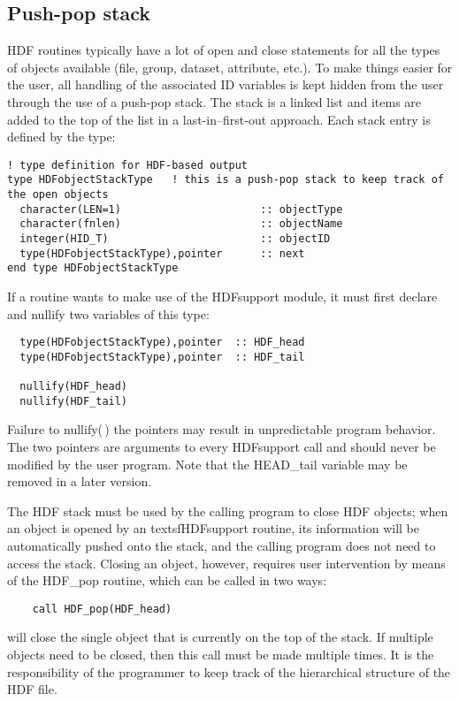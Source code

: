 \documentclass[DIV=calc, paper=letter, fontsize=11pt]{scrartcl}	 %
\begin{document}
\subsection{Push-pop stack}
HDF routines typically have a lot of \textsf{open} and \textsf{close} statements for all the types 
of objects available (file, group, dataset, attribute, etc.).  To make things easier for the user, 
all handling of the associated ID variables is kept hidden from the user through the use of a push-pop
stack.  The stack is a linked list and items are added to the top of the list in a \textsf{last-in--first-out}
approach.  Each stack entry is defined by the type:
\begin{verbatim}
! type definition for HDF-based output
type HDFobjectStackType   ! this is a push-pop stack to keep track of the open objects
  character(LEN=1)						:: objectType
  character(fnlen)						:: objectName
  integer(HID_T) 						:: objectID
  type(HDFobjectStackType),pointer		:: next
end type HDFobjectStackType
\end{verbatim}
If a routine wants to make use of the \textsf{HDFsupport} module, it must first declare
and nullify two variables of this type:
\begin{verbatim}
  type(HDFobjectStackType),pointer  :: HDF_head
  type(HDFobjectStackType),pointer  :: HDF_tail

  nullify(HDF_head)
  nullify(HDF_tail)
\end{verbatim}
Failure to \textsf{nullify(\,)} the pointers may result in unpredictable program behavior.  The two 
pointers are arguments to every \textsf{HDFsupport} call and should never be modified by the user 
program.  Note that the \textsf{HEAD\_tail} variable may be removed in a later version.

The HDF stack must be used by the calling program to close HDF objects; when an object is opened 
by an textsf{HDFsupport} routine, its information will be automatically pushed onto the stack, and the 
calling program does not need to access the stack.  Closing an object, however, requires user intervention
by means of the \textsf{HDF\_pop} routine, which can be called in two ways:
\begin{verbatim}
	call HDF_pop(HDF_head)
\end{verbatim}
will close the single object that is currently on the top of the stack. If multiple objects need to
be closed, then this call must be made multiple times.  It is the responsibility of the programmer to 
keep track of the hierarchical structure of the HDF file.
\end{document}
